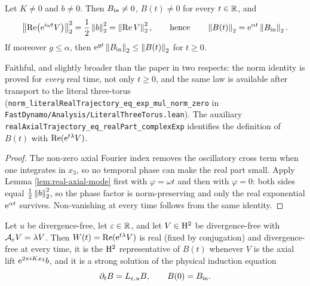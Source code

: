 \begin{lemma}
  \label{lem:finish:norm-law}
  \leanok
  Let $K\neq0$ and $b\neq0$.  Then $B_{\rm in}\neq0$, $B(t)\neq0$ for every $t\in\mathbb{R}$, and
  \[
    \left\|\operatorname{Re}\bigl(\mathrm{e}^{i\omega t}V\bigr)\right\|_2^2=\frac12\left\|b\right\|_2^2=\left\|\operatorname{Re} V\right\|_2^2,
    \qquad\text{hence}\qquad
    \left\|B(t)\right\|_2=\mathrm{e}^{\alpha t}\left\|B_{\rm in}\right\|_2 .
  \]
  If moreover $g\leq\alpha$, then $\mathrm{e}^{gt}\left\|B_{\rm in}\right\|_2\leq\left\|B(t)\right\|_2$ for $t\geq0$.
\end{lemma}

Faithful, and slightly broader than the paper in two respects: the norm identity is proved for
\emph{every} real time, not only $t\geq0$, and the same law is available after transport to the
literal three-torus (\texttt{norm\_literalRealTrajectory\_eq\_exp\_mul\_norm\_zero} in
\texttt{FastDynamo/Analysis/LiteralThreeTorus.lean}).  The auxiliary
\texttt{realAxialTrajectory\_eq\_realPart\_complexExp} identifies the definition of $B(t)$ with
$\operatorname{Re}(\mathrm{e}^{t\lambda}V)$.

\begin{proof}
  \leanok
  The non-zero axial Fourier index removes the oscillatory cross term when one integrates in
  $x_3$, so no temporal phase can make the real part small.  Apply Lemma
  \ref{lem:real-axial-mode} first with $\varphi=\omega t$ and then with $\varphi=0$: both sides
  equal $\frac12\left\|b\right\|_2^2$, so the phase factor is norm-preserving and only the real
  exponential $\mathrm{e}^{\alpha t}$ survives.  Non-vanishing at every time follows from the same
  identity.
\end{proof}

\begin{lemma}
  \label{lem:finish:strong-solution}
  \leanok
  Let $u$ be divergence-free, let $\varepsilon\in\mathbb{R}$, and let $V\in\mathrm{H}^2$ be divergence-free with
  $\mathcal{A}_\varepsilon V=\lambda V$.  Then $W(t)=\operatorname{Re}(\mathrm{e}^{t\lambda}V)$ is real (fixed by conjugation)
  and divergence-free at every time, it is the $\mathrm{H}^2$ representative of $B(t)$ whenever $V$ is the
  axial lift $\mathrm{e}^{2\pi iKx_3}b$, and it is a strong solution of the physical induction equation
  \[
    \partial_tB=L_{\varepsilon,u}B,\qquad B(0)=B_{\rm in} .
  \]
\end{lemma}

